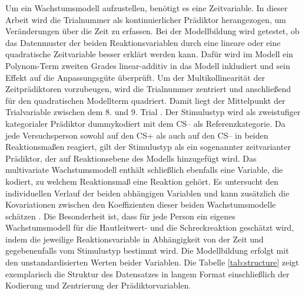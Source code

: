 		Um ein Wachstumsmodell aufzustellen, benötigt es eine Zeitvariable. In dieser Arbeit wird die Trialnummer als kontinuierlicher Prädiktor herangezogen, um Veränderungen über die Zeit zu erfassen. Bei der Modellbildung wird getestet, ob das Datenmuster der beiden Reaktionsvariablen durch eine lineare oder eine quadratische Zeitvariable besser erklärt werden kann. Dafür wird im Modell ein Polynom-Term zweiten Grades linear-additiv in das Modell inkludiert und sein Effekt auf die Anpassungsgüte überprüft. 
		Um der Multikollinearität der Zeitprädiktoren vorzubeugen, wird die Trialnummer zentriert und anschließend für den quadratischen Modellterm quadriert. Damit liegt der Mittelpunkt der Trialvariable zwischen dem 8. und 9. Trial \parencite[analog zu][]{KRISTJANSSON2007}.
		Der Stimulustyp wird als zweistufiger kategorialer Prädiktor dummykodiert mit dem CS-- als Referenzkategorie. Da jede Versuchsperson sowohl auf den CS+ als auch auf den CS-- in beiden Reaktionsmaßen reagiert, gilt der Stimulustyp als ein sogenannter zeitvarianter Prädiktor, der auf Reaktionsebene des Modells hinzugefügt wird.
		Das multivariate Wachstumsmodell enthält schließlich ebenfalls eine Variable, die kodiert, zu welchem Reaktionsmaß eine Reaktion gehört. Es untersucht den individuellen Verlauf der beiden abhängigen Variablen und kann zusätzlich die Kovariationen zwischen den Koeffizienten dieser beiden Wachstumsmodelle schätzen \parencite{GRIMM2017}. Die Besonderheit ist, dass für jede Person ein eigenes Wachstumsmodell für die Hautleitwert- und die Schreckreaktion geschätzt wird, indem die jeweilige Reaktionsvariable in Abhängigkeit von der Zeit und gegebenenfalls vom Stimulustyp bestimmt wird.
		Die Modellbildung erfolgt mit den unstandardisierten Werten beider Variablen. %
		Die Tabelle \ref{tab:structure} zeigt exemplarisch die Struktur des Datensatzes in langem Format einschließlich der Kodierung und Zentrierung der Prädiktorvariablen.

